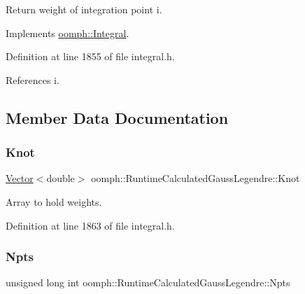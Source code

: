 Return weight of integration point i. 



Implements \hyperlink{classoomph_1_1Integral_ac65335e2aab120b285b3d6c294507b06}{oomph\+::\+Integral}.



Definition at line 1855 of file integral.\+h.



References i.



\subsection{Member Data Documentation}
\mbox{\label{classoomph_1_1RuntimeCalculatedGaussLegendre_a9fb3def42d11c280d2de76261fea8f5d}} 
\subsubsection{\texorpdfstring{Knot}{Knot}}
{\footnotesize\ttfamily \hyperlink{classoomph_1_1Vector}{Vector}$<$double$>$ oomph\+::\+Runtime\+Calculated\+Gauss\+Legendre\+::\+Knot\hspace{0.3cm}{\ttfamily [private]}}



Array to hold weights. 



Definition at line 1863 of file integral.\+h.

\mbox{\label{classoomph_1_1RuntimeCalculatedGaussLegendre_a3d6d54efb113cac80524fa3466847bb7}} 
\subsubsection{\texorpdfstring{Npts}{Npts}}
{\footnotesize\ttfamily unsigned long int oomph\+::\+Runtime\+Calculated\+Gauss\+Legendre\+::\+Npts\hspace{0.3cm}{\ttfamily [private]}}



